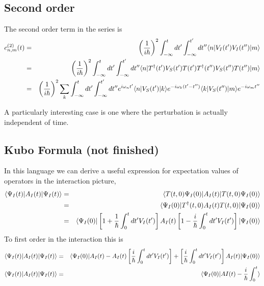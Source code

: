 \subsection{Second order}
The second order term in the series is \begin{eqnarray}
c^{(2)}_{n,m}(t) &=& \left(\frac{1}{i\hbar}\right)^2 \int_{-\infty}^{t}dt' \int_{-\infty}^{t'} dt'' \langle n |V_I(t')V_I(t'')| m \rangle \\
&=& \left(\frac{1}{i\hbar}\right)^2 \int_{-\infty}^{t}dt' \int_{-\infty}^{t'} dt'' \langle n |T^{\dagger}(t')V_S(t')T(t')T^{\dagger}(t'')V_S(t'')T(t'')| m \rangle \\
&=& \left(\frac{1}{i\hbar}\right)^2 \sum_{k} \int_{-\infty}^{t}dt' \int_{-\infty}^{t'} dt'' e^{i\omega_n t'} \langle n|V_S(t')|k\rangle e^{-i \omega_k (t'-t'')} \langle k|V_S(t'')|m\rangle e^{-i\omega_m t''}
\end{eqnarray}

A particularly interesting case is one where the perturbation is actually independent of time.

\subsection{Kubo Formula (not finished)}
In this language we can derive a useful expression for expectation
values of operators in the interaction picture, \begin{eqnarray*}
\langle \Psi_{I}(t)|A_{I}(t)|\Psi_{I}(t)\rangle & = & \langle T(t,0)\Psi_{I}(0) |A_{I}(t)| T(t,0)\Psi_{I}(0) \rangle\\
& = & \langle \Psi_{I}(0) |T^{\dagger}(t,0)A_{I}(t)T(t,0)| \Psi_{I}(0) \rangle\\
& = & \langle \Psi_{I}(0) |\left[1+\frac{1}{\hbar}\int_{0}^{t}dt'V_{I}(t')\right]A_{I}(t)\left[1-\frac{i}{\hbar}\int_{0}^{t}dt'V_{I}(t')\right]| \Psi_{I}(0) \rangle\end{eqnarray*}
To first order in the interaction this is \begin{eqnarray*}
\langle \Psi_{I}(t)|A_{I}(t)|\Psi_{I}(t)\rangle & = & \langle \Psi_{I}(0)|A_{I}(t)-A_{I}(t)\left[\frac{i}{\hbar}\int_{0}^{t}dt'V_{I}(t')\right]+\left[\frac{i}{\hbar}\int_{0}^{t}dt'V_{I}(t')\right]A_{I}(t)|\Psi_{I}(0)\rangle\\
\langle \Psi_{I}(t)|A_{I}(t)|\Psi_{I}(t)\rangle & = & \langle \Psi_{I}(0)|AI(t)-\frac{i}{\hbar}\int_{0}^{t}\rangle\end{eqnarray*}
